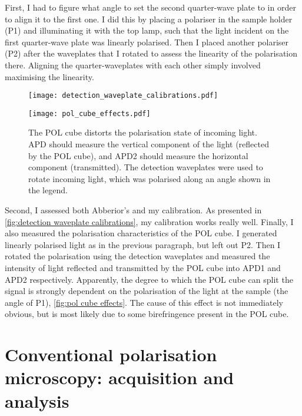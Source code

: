 First, I had to figure what angle to set the second quarter-wave plate to in order to align it to the first one. I did this by placing a polariser in the sample holder (P1) and illuminating it with the top lamp, such that the light incident on the first quarter-wave plate was linearly polarised. Then I placed another polariser (P2) after the waveplates that I rotated to assess the linearity of the polarisation there. Aligning the quarter-waveplates with each other simply involved maximising the linearity. 


\begin{figure}
	\centering
	\texttt{[image: detection\_waveplate\_calibrations.pdf]}
	\caption{
	}
	\label{fig:detection waveplate calibrations}
\end{figure}


\begin{figure}
	\centering
	\texttt{[image: pol\_cube\_effects.pdf]}
	\caption{The POL cube distorts the polarisation state of incoming light. APD should measure the vertical component of the light (reflected by the POL cube), and APD2 should measure the horizontal component (transmitted). The detection waveplates were used to rotate incoming light, which was polarised along an angle shown in the legend. }
	\label{fig:pol cube effects}
\end{figure}


Second, I assessed both Abberior's and my calibration. As presented in \autoref{fig:detection waveplate calibrations}, my calibration works really well.  Finally, I also measured the polarisation characteristics of the POL cube. I generated linearly polarised light as in the previous paragraph, but left out P2. Then I rotated the polarisation using the detection waveplates and measured the intensity of light reflected and transmitted by the POL cube into APD1 and APD2 respectively. Apparently, the degree to which the POL cube can split the signal is strongly dependent on the polarisation of the light at the sample (the angle of P1), \autoref{fig:pol cube effects}. The cause of this effect is not immediately obvious, but is most likely due to some birefringence present in the POL cube.

\section{Conventional polarisation microscopy: acquisition and analysis}
\label{sec:pol analysis}
 
